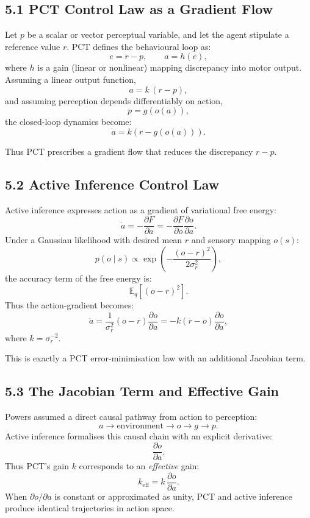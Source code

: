 \documentclass[11pt,a4paper,twoside]{article}
\begin{document}
\subsection*{5.1 PCT Control Law as a Gradient Flow}

Let $p$ be a scalar or vector perceptual variable,
and let the agent stipulate a reference value $r$.
PCT defines the behavioural loop as:
\[
e = r - p, \qquad
a = h(e),
\]
where $h$ is a gain (linear or nonlinear) mapping discrepancy into motor output.
Assuming a linear output function,
\[
a = k \, (r - p),
\]
and assuming perception depends differentiably on action,
\[
p = g(o(a)),
\]
the closed-loop dynamics become:
\[
\dot{a} = k \left( r - g(o(a)) \right).
\]

Thus PCT prescribes a gradient flow that reduces the discrepancy $r - p$.

\subsection*{5.2 Active Inference Control Law}

Active inference expresses action as a gradient of variational free energy:
\[
\dot{a} = -\frac{\partial F}{\partial a}
       = -\frac{\partial F}{\partial o}\frac{\partial o}{\partial a}.
\]
Under a Gaussian likelihood with desired mean $r$ and sensory mapping $o(s)$:
\[
p(o\mid s) \propto \exp\!\left(
 -\frac{(o-r)^2}{2\sigma_r^2}
\right),
\]
the accuracy term of the free energy is:
\[
\mathbb{E}_q[(o - r)^2].
\]
Thus the action-gradient becomes:
\[
\dot{a} = \frac{1}{\sigma_r^2}
          (o - r)\frac{\partial o}{\partial a}
        = -k (r - o)\frac{\partial o}{\partial a},
\]
where $k = \sigma_r^{-2}$.

This is exactly a PCT error-minimisation law with an additional Jacobian term.

\subsection*{5.3 The Jacobian Term and Effective Gain}

Powers assumed a direct causal pathway from action to perception:
\[
a \rightarrow \text{environment} \rightarrow o \rightarrow g \rightarrow p.
\]
Active inference formalises this causal chain with an explicit derivative:
\[
\frac{\partial o}{\partial a}.
\]
Thus PCT’s gain $k$ corresponds to an \emph{effective} gain:
\[
k_{\text{eff}} = k \,\frac{\partial o}{\partial a}.
\]
When $\partial o/\partial a$ is constant or approximated as unity,
PCT and active inference produce identical trajectories in action space.
\end{document}
